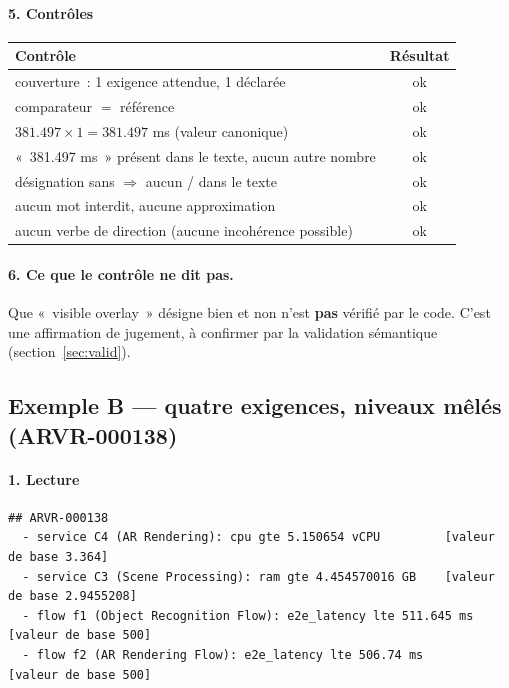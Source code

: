 \documentclass[11pt,a4paper]{article}
\newcommand{\code}[1]{\texttt{\detokenize{#1}}}
\begin{document}
\paragraph{5. Contrôles}
\begin{center}\small
\begin{tabular}{@{}lc@{}}
\toprule
Contrôle & Résultat \\
\midrule
couverture~: 1 exigence attendue, 1 déclarée & \textcolor{ok}{ok} \\
comparateur \code{lte} $=$ référence & \textcolor{ok}{ok} \\
$381.497\times 1 = 381.497$ ms (valeur canonique) & \textcolor{ok}{ok} \\
«~381.497 ms~» présent dans le texte, aucun autre nombre & \textcolor{ok}{ok} \\
désignation sans \code{id} $\Rightarrow$ aucun \code{f1}/\code{f2} dans le texte & \textcolor{ok}{ok} \\
aucun mot interdit, aucune approximation & \textcolor{ok}{ok} \\
aucun verbe de direction (aucune incohérence possible) & \textcolor{ok}{ok} \\
\bottomrule
\end{tabular}
\end{center}

\paragraph{6. Ce que le contrôle ne dit pas.}
Que «~visible overlay~» désigne bien \code{f2} et non \code{f1} n'est \textbf{pas} vérifié par le code. C'est une affirmation de jugement, à confirmer par la validation sémantique (section~\ref{sec:valid}).

\subsection{Exemple B --- quatre exigences, niveaux mêlés (ARVR-000138)}

\paragraph{1. Lecture}
\begin{lstlisting}
## ARVR-000138
  - service C4 (AR Rendering): cpu gte 5.150654 vCPU         [valeur de base 3.364]
  - service C3 (Scene Processing): ram gte 4.454570016 GB    [valeur de base 2.9455208]
  - flow f1 (Object Recognition Flow): e2e_latency lte 511.645 ms  [valeur de base 500]
  - flow f2 (AR Rendering Flow): e2e_latency lte 506.74 ms         [valeur de base 500]
\end{lstlisting}
\end{document}
